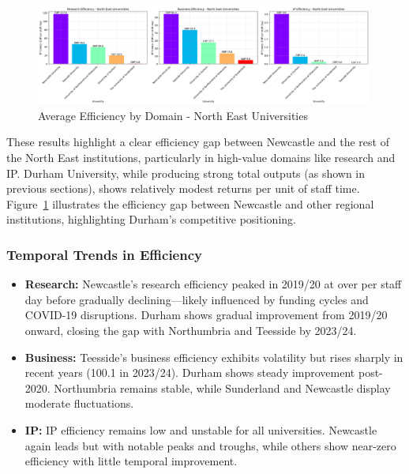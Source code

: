 \documentclass[journal,onecolumn, 10pt,draftclsnofoot]{IEEEtran}
\begin{document}
\begin{figure}[h]
\centering
\includegraphics[width=0.99\textwidth]{Fig/figure38.ne_efficiency_comparison.png}
\caption{Average Efficiency by Domain - North East Universities}
\label{fig:ne-efficiency-comparison}
\end{figure}

These results highlight a clear efficiency gap between Newcastle and the rest of the North East institutions, particularly in high-value domains like research and IP. Durham University, while producing strong total outputs (as shown in previous sections), shows relatively modest returns per unit of staff time. Figure~\ref{fig:ne-efficiency-comparison} illustrates the efficiency gap between Newcastle and other regional institutions, highlighting Durham's competitive positioning.

\subsubsection{Temporal Trends in Efficiency}

\begin{itemize}
    \item \textbf{Research:} Newcastle's research efficiency peaked in 2019/20 at over  per staff day before gradually declining—likely influenced by funding cycles and COVID-19 disruptions. Durham shows gradual improvement from 2019/20 onward, closing the gap with Northumbria and Teesside by 2023/24.
    
    \item \textbf{Business:} Teesside's business efficiency exhibits volatility but rises sharply in recent years (100.1 in 2023/24). Durham shows steady improvement post-2020. Northumbria remains stable, while Sunderland and Newcastle display moderate fluctuations.
    
    \item \textbf{IP:} IP efficiency remains low and unstable for all universities. Newcastle again leads but with notable peaks and troughs, while others show near-zero efficiency with little temporal improvement.
\end{itemize}
\end{document}
